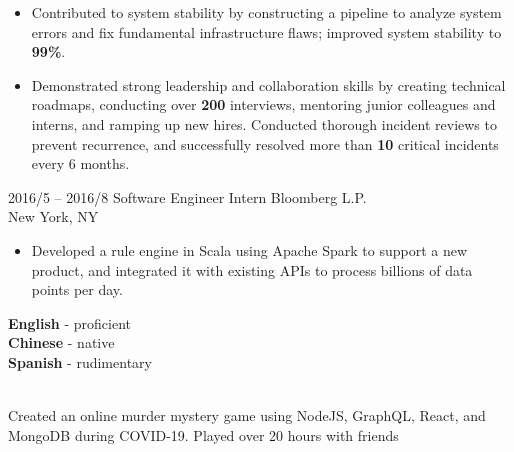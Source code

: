 \documentclass[9pt]{developercv} %
\begin{document}
\begin{entrylist}
{\begin{itemize}[leftmargin=-0.0125in]
				\item Contributed to system stability by constructing a pipeline to analyze system errors and fix fundamental infrastructure flaws; improved system stability to \textbf{99\%}.
				\item Demonstrated strong leadership and collaboration skills by creating technical roadmaps, conducting over \textbf{200} interviews, mentoring junior colleagues and interns, and ramping up new hires. Conducted thorough incident reviews to prevent recurrence, and successfully resolved more than \textbf{10} critical incidents every 6 months.
				\end{itemize}
		}
	\entry
		{2016/5 -- 2016/8}
		{Software Engineer Intern}
		{Bloomberg L.P. \\\footnotesize{New York, NY}}
		{
			\begin{itemize}[leftmargin=-0.0125in]
		\item Developed a rule engine in Scala using Apache Spark to support a new product, and integrated it with existing APIs to process billions of data points per day.
	 	\end{itemize}
		}
\end{entrylist}


\begin{minipage}[t]{0.4\textwidth} %
	\vspace{-\baselineskip} %

	\begin{barchart}{4}
	\end{barchart}
\end{minipage}
\hfill
\begin{minipage}[t]{0.3\textwidth}
	\vspace{-\baselineskip} %
	
	
	\textbf{English} - proficient\\
	\textbf{Chinese} - native\\
	\textbf{Spanish} - rudimentary

	\\
	Created an online murder mystery game using NodeJS, GraphQL, React, and MongoDB during COVID-19. Played over 20 hours with friends
\end{minipage}
\hfill
\end{document}
